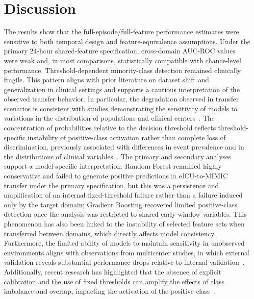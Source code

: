 \documentclass[utf8]{FrontiersinHarvard} %
\begin{document}
\section{Discussion}
The results show that the full-episode/full-feature performance estimates were sensitive to both temporal design and feature-equivalence assumptions. Under the primary 24-hour shared-feature specification, cross-domain AUC-ROC values were weak and, in most comparisons, statistically compatible with chance-level performance. Threshold-dependent minority-class detection remained clinically fragile. This pattern aligns with prior literature on dataset shift and generalization in clinical settings and supports a cautious interpretation of the observed transfer behavior. In particular, the degradation observed in transfer scenarios is consistent with studies demonstrating the sensitivity of models to variations in the distribution of populations and clinical centers~\citet{Matta2024,Musa2026}. The concentration of probabilities relative to the decision threshold reflects threshold-specific instability of positive-class activation rather than complete loss of discrimination, previously associated with differences in event prevalence and in the distributions of clinical variables~\citet{Chen2025,Wang2025}. The primary and secondary analyses support a model-specific interpretation: Random Forest remained highly conservative and failed to generate positive predictions in eICU-to-MIMIC transfer under the primary specification, but this was a persistence and amplification of an internal fixed-threshold failure rather than a failure induced only by the target domain; Gradient Boosting recovered limited positive-class detection once the analysis was restricted to shared early-window variables. This phenomenon has also been linked to the instability of selected feature sets when transferred between domains, which directly affects model consistency~\citet{Theng2023}. Furthermore, the limited ability of models to maintain sensitivity in unobserved environments aligns with observations from multicenter studies, in which external validation reveals substantial performance drops relative to internal validation~\citet{Mercier2026}. Additionally, recent research has highlighted that the absence of explicit calibration and the use of fixed thresholds can amplify the effects of class imbalance and overlap, impacting the activation of the positive class~\citet{Dardour2025,Sowan2025,Vlasic2025}.
\end{document}
